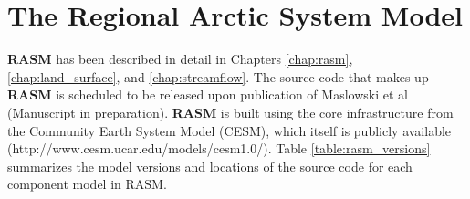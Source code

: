 \section{The Regional Arctic System Model}
\label{sec:rasm_dev}

\textbf{RASM} has been described in detail in Chapters \ref{chap:rasm}, \ref{chap:land_surface}, and \ref{chap:streamflow}.
The source code that makes up \textbf{RASM} is scheduled to be released upon publication of Maslowski et al (Manuscript in preparation).
\textbf{RASM} is built using the core infrastructure from the Community Earth System Model (CESM), which itself is publicly available (http://www.cesm.ucar.edu/models/cesm1.0/).
Table \ref{table:rasm_versions} summarizes the model versions and locations of the source code for each component model in RASM.

\begin{table}[]
\centering
\caption{Versions and primary citations for core RASM component models.}
\label{table:rasm_versions}
\end{table}

